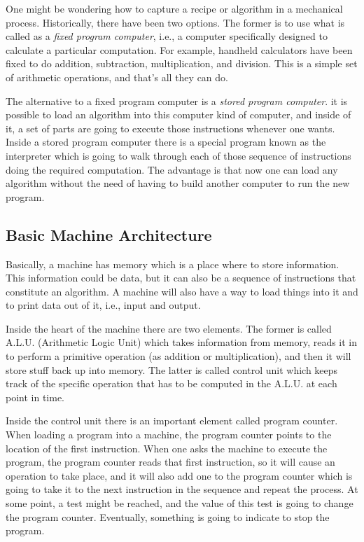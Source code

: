 \documentclass[a4paper]{article}
\begin{document}
One might be wondering how to capture a recipe or algorithm in a mechanical
process. Historically, there have been two options. The former is to use what
is called as a \textit{fixed program computer}, i.e., a computer specifically
designed to calculate a particular computation. For example, handheld
calculators have been fixed to do addition, subtraction, multiplication, and
division. This is a simple set of arithmetic operations, and that's all they
can do.

The alternative to a fixed program computer is a \textit{stored program
computer}. it is possible to load an algorithm into this computer kind of
computer, and inside of it, a set of parts are going to execute those
instructions whenever one wants. Inside a stored program computer there is a
special program known as the interpreter which is going to walk through each
of those sequence of instructions doing the required computation. The advantage
is that now one can load any algorithm without the need of having to build
another computer to run the new program.

\subsection{Basic Machine Architecture}

Basically, a machine has memory which is a place where to store information.
This information could be data, but it can also be a sequence of instructions
that constitute an algorithm. A machine will also have a way to load things
into it and to print data out of it, i.e., input and output.

Inside the heart of the machine there are two elements. The former is called
A.L.U. (Arithmetic Logic Unit) which takes information from memory, reads it
in to perform a primitive operation (as addition or multiplication), and
then it will store stuff back up into memory. The latter is called control
unit which keeps track of the specific operation that has to be
computed in the A.L.U. at each point in time.

Inside the control unit there is an important element called program counter.
When loading a program into a machine, the program counter points to the
location of the first instruction. When one asks the machine to execute the
program, the program counter reads that first instruction, so it will cause an
operation to take place, and it will also add one to the program counter which
is going to take it to the next instruction in the sequence and repeat the
process. At some point, a test might be reached, and the value of this test is
going to change the program counter. Eventually, something is going to indicate
to stop the program.
\end{document}
